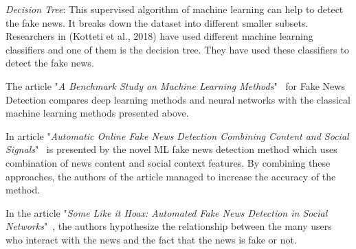 \textit{Decision Tree}: This supervised algorithm of machine learning can help to detect the fake news.
It breaks down the dataset into different smaller subsets.
Researchers in (Kotteti et al., 2018) have used different machine learning classifiers and one of them is the decision tree.
They have used these classifiers to detect the fake news.

The article "\textit{A Benchmark Study on Machine Learning Methods}"~\cite{7} for Fake News Detection compares deep learning methods and neural networks with the classical machine learning methods presented above.

In article "\textit{Automatic Online Fake News Detection Combining Content and Social Signals}"~\cite{5} is presented by the novel ML fake news detection method which uses combination of news content and social context features.
By combining these approaches, the authors of the article managed to increase the accuracy of the method.

In the article "\textit{Some Like it Hoax: Automated Fake News Detection in Social Networks}"~\cite{6}, the authors hypothesize the relationship between the many users who interact with the news and the fact that the news is fake or not.
